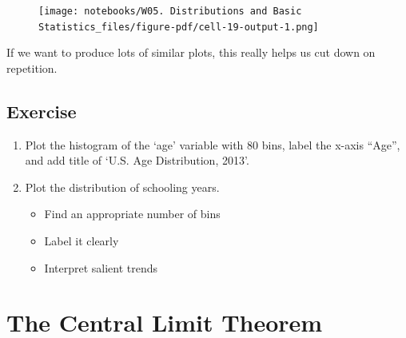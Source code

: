 \documentclass[
  letterpaper,
  DIV=11,
  numbers=noendperiod]{scrreprt}
\newenvironment{Shaded}{\begin{snugshade}}{\end{snugshade}}
\newcommand{\DecValTok}[1]{\textcolor[rgb]{0.68,0.00,0.00}{#1}}
\newcommand{\NormalTok}[1]{\textcolor[rgb]{0.00,0.23,0.31}{#1}}
\newcommand{\OperatorTok}[1]{\textcolor[rgb]{0.37,0.37,0.37}{#1}}
\newcommand{\StringTok}[1]{\textcolor[rgb]{0.13,0.47,0.30}{#1}}
\providecommand{\tightlist}{%
  \setlength{\itemsep}{0pt}\setlength{\parskip}{0pt}}\usepackage{longtable,booktabs,array}
\begin{document}
\begin{Shaded}
\end{Shaded}

\begin{figure}[H]

{\centering \texttt{[image: notebooks/W05. Distributions and Basic Statistics\_files/figure-pdf/cell-19-output-1.png]}

}

\end{figure}

If we want to produce lots of similar plots, this really helps us cut
down on repetition.

\hypertarget{exercise-13}{%
\subsection{Exercise}\label{exercise-13}}

\begin{enumerate}
\def\labelenumi{\arabic{enumi}.}
\tightlist
\item
  Plot the histogram of the `age' variable with 80 bins, label the
  x-axis ``Age'', and add title of `U.S. Age Distribution, 2013'.
\item
  Plot the distribution of schooling years.

  \begin{itemize}
  \tightlist
  \item
    Find an appropriate number of bins
  \item
    Label it clearly
  \item
    Interpret salient trends
  \end{itemize}
\end{enumerate}

\hypertarget{the-central-limit-theorem}{%
\section{The Central Limit Theorem}\label{the-central-limit-theorem}}
\end{document}
